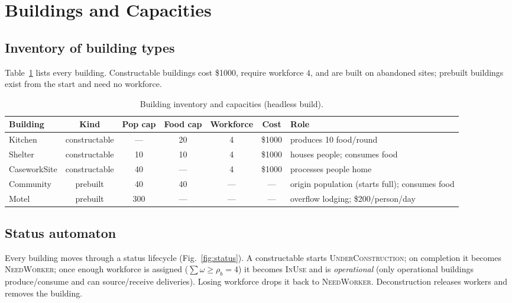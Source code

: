 \documentclass[11pt]{article}
\begin{document}
\section{Buildings and Capacities}
\label{sec:buildings}

\subsection{Inventory of building types}
Table~\ref{tab:buildings} lists every building. Constructable buildings cost
\$1000, require workforce $4$, and are built on abandoned sites; prebuilt
buildings exist from the start and need no workforce.

\begin{table}[h]
\centering\small
\begin{tabular}{@{}lcccccl@{}}
\toprule
Building & Kind & Pop cap & Food cap & Workforce & Cost & Role \\
\midrule
Kitchen      & constructable & --- & 20 & 4 & \$1000 & produces 10 food/round \\
Shelter      & constructable & 10 & 10 & 4 & \$1000 & houses people; consumes food \\
CaseworkSite & constructable & 40 & --- & 4 & \$1000 & processes people home \\
Community    & prebuilt & 40 & 40 & --- & --- & origin population (starts full); consumes food \\
Motel        & prebuilt & 300 & --- & --- & --- & overflow lodging; \$200/person/day \\
\bottomrule
\end{tabular}
\caption{Building inventory and capacities (headless build).}
\label{tab:buildings}
\end{table}

\subsection{Status automaton}
Every building moves through a status lifecycle (Fig.~\ref{fig:status}). A
constructable starts \textsc{UnderConstruction}; on completion it becomes
\textsc{NeedWorker}; once enough workforce is assigned
($\sum\omega \geq \rho_b = 4$) it becomes \textsc{InUse} and is
\emph{operational} (only operational buildings produce/consume and can
source/receive deliveries). Losing workforce drops it back to
\textsc{NeedWorker}. Deconstruction releases workers and removes the building.
\end{document}
